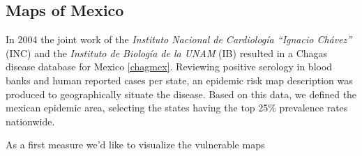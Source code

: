 \subsection{Maps of Mexico}

In 2004 the joint work of the \textit{Instituto Nacional de Cardiología “Ignacio Chávez”} (INC) and the \textit{Instituto de Biología de la UNAM } (IB) resulted in a Chagas disease database for Mexico \ref{chagmex}. Reviewing positive serology in blood banks and human reported cases per state, an epidemic risk map description was produced to geographically situate the disease. Based on this data, we defined the mexican epidemic area, selecting the states having the top 25\% prevalence rates nationwide. 



As a first measure we'd like to visualize the vulnerable maps 